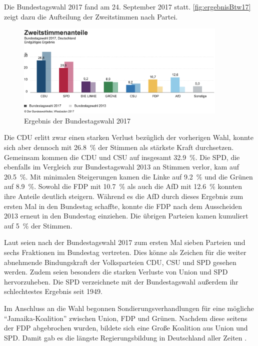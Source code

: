 Die Bundestagswahl \num{2017} fand am \num{24}. September \num{2017} statt. \autoref{fig:ergebnisBtw17} zeigt dazu die Aufteilung der Zweitstimmen nach Partei.

\begin{figure}[H]
    \centering
    \includegraphics[width=0.9\textwidth]{data/images/ergebnisBtw17.png}
    \caption{Ergebnis der Bundestagswahl \num{2017} \autocite{noauthor_bundestagswahl_nodate}} \label{fig:ergebnisBtw17}
\end{figure}

Die \ac{CDU} erlitt zwar einen starken Verlust bezüglich der vorherigen Wahl, konnte sich aber dennoch mit \SI{26.8}{\percent} der Stimmen als stärkste Kraft durchsetzen. Gemeinsam kommen die \ac{CDU} und \acs{CSU} auf insgesamt \SI{32.9}{\percent}. Die \ac{SPD}, die ebenfalls im Vergleich zur Bundestagswahl \num{2013} an Stimmen verlor, kam auf \SI{20.5}{\percent}. Mit minimalen Steigerungen kamen die Linke auf \SI{9.2}{\percent} und die Grünen auf \SI{8.9}{\percent}. Sowohl die \ac{FDP} mit \SI{10.7}{\percent} als auch die \ac{AfD} mit \SI{12.6}{\percent} konnten ihre Anteile deutlich steigern. Während es die \ac{AfD} durch dieses Ergebnis zum ersten Mal in den Bundestag schaffte, konnte die \ac{FDP} nach dem Ausscheiden \num{2013} erneut in den Bundestag einziehen. Die übrigen Parteien kamen kumuliert auf \SI{5}{\percent} der Stimmen.

Laut \textcite{schmid_deutscher_2021} seien nach der Bundestagswahl \num{2017} zum ersten Mal sieben Parteien und sechs Fraktionen im Bundestag vertreten. Dies könne als Zeichen für die weiter abnehmende Bindungskraft der Volksparteien \ac{CDU}, \ac{CSU} und \ac{SPD} gesehen werden. Zudem seien besonders die starken Verluste von Union und \ac{SPD} hervorzuheben. Die \ac{SPD} verzeichnete mit der Bundestagswahl außerdem ihr schlechtestes Ergebnis seit \num{1949}.

Im Anschluss an die Wahl begonnen Sondierungsverhandlungen für eine mögliche \enquote{Jamaika-Koalition} zwischen Union, \ac{FDP} und Grünen. Nachdem diese seitens der \ac{FDP} abgebrochen wurden, bildete sich eine Große Koalition aus Union und \ac{SPD}. Damit gab es die längste Regierungsbildung in Deutschland aller Zeiten \parencite{schmid_deutscher_2021}.

